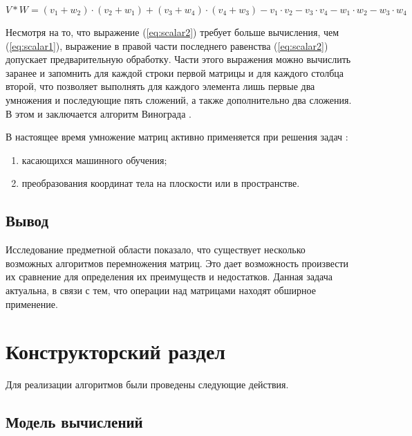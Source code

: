 \documentclass[12pt,a4paper]{scrartcl}
\begin{document}
	\begin{equation}\label{eq:scalar2}
	V * W = (v_1 + w_2) \cdot (v_2 + w_1) + (v_3 + w_4) \cdot (v_4 + w_3) - v_1 \cdot v_2 - v_3 \cdot v_4 - w_1 \cdot w_2 - w_3 \cdot w_4
	\end{equation}
	
	Несмотря на то, что выражение (\ref{eq:scalar2}) требует больше вычисления, чем (\ref{eq:scalar1}), выражение в правой части последнего равенства (\ref{eq:scalar2}) допускает предварительную обработку\cite{Coppersmith_Winograd}. 
	Части этого выражения можно вычислить заранее и запомнить для каждой строки первой матрицы и для каждого столбца второй, что позволяет выполнять для каждого элемента лишь первые два умножения и последующие пять сложений, а также дополнительно два сложения.
	В этом и заключается алгоритм Винограда \cite{Coppersmith_Winograd_2}. 
	
	В настоящее время умножение матриц активно применяется при решения задач \cite{Matrix_Mult}:
	
	\begin{enumerate}
		\item {касающихся машинного обучения; }
		\item {преобразования координат тела на плоскости или в пространстве.} 	
	\end{enumerate}
	

	\subsection{Вывод}
	\label{sec:analitics:conclusion}
	
	Исследование предметной области показало, что существует несколько возможных алгоритмов
	перемножения матриц. Это дает возможность произвести их сравнение для определения их преимуществ и недостатков.
	Данная задача актуальна, в связи с тем, что операции над матрицами находят обширное применение.

    \newpage
	\section{Конструкторский раздел}
	\label{sec:construct}
	
	Для реализации алгоритмов были проведены следующие действия.

\subsection{Модель вычислений}
\label{sec:construct:model}
\end{document}
